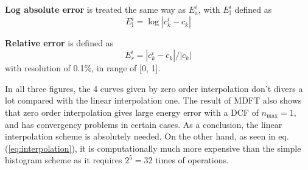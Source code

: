 \textbf{Log absolute error} is treated the same way as $E_{\mathrm{a}}^{i}$,
with $E_{\mathrm{l}}^{i}$ defined as
\begin{equation}
E_{\mathrm{l}}^{i}=\log\left|c_{k}^{i}-c_{k}\right|
\end{equation}


\textbf{Relative error} is defined as
\begin{equation}
E_{r}^{i}=\left|c_{k}^{i}-c_{k}\right|/\left|c_{k}\right|\label{eq:Er}
\end{equation}
with resolution of 0.1\%, in range of {[}0, 1{]}.

In all three figures, the 4 curves given by zero order interpolation
don't divers a lot compared with the linear interpolation one. The
result of MDFT also shows that zero order interpolation gives large
energy error with a DCF of $n_{\max}=1$, and has convergency problems
in certain cases. As a conclusion, the linear interpolation scheme
is absolutely needed. On the other hand, as seen in eq. (\ref{eq:interpolation}),
it is computationally much more expensive than the simple histogram
scheme as it requires $2^{5}=32$ times of operations.
